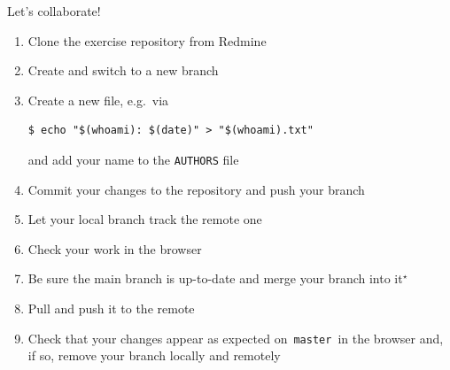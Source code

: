 \documentclass[usenames,svgnames,14pt]{beamer}
\begin{document}
\begin{frame}[fragile]{Let's collaborate!}
    \small
    \setlength{\leftmargini}{5mm}
    \begin{enumerate}
        \setlength{\itemsep}{-1mm}
        \item Clone the exercise repository from Redmine\\
        \then {}
        \item Create and switch to a new branch
        \item Create a new file, e.g.\ via
        \begin{lstlisting}[style=MyBash, xleftmargin=3mm, xrightmargin=28mm, belowskip=-9mm, aboveskip=2mm]
            $ echo "$(whoami): $(date)" > "$(whoami).txt"
        \end{lstlisting}
        and add your name to the \texttt{AUTHORS} file
        \item Commit your changes to the repository and push your branch
        \item Let your local branch track the remote one
        \item Check your work in the browser
        \item Be sure the main branch is up-to-date and merge your branch into it$^\star$
        \item Pull and push it to the remote
        \item Check that your changes appear as expected on \,\texttt{master}\, in the browser and, if so, remove your branch locally and remotely
    \end{enumerate}
\end{frame}

\end{document}
